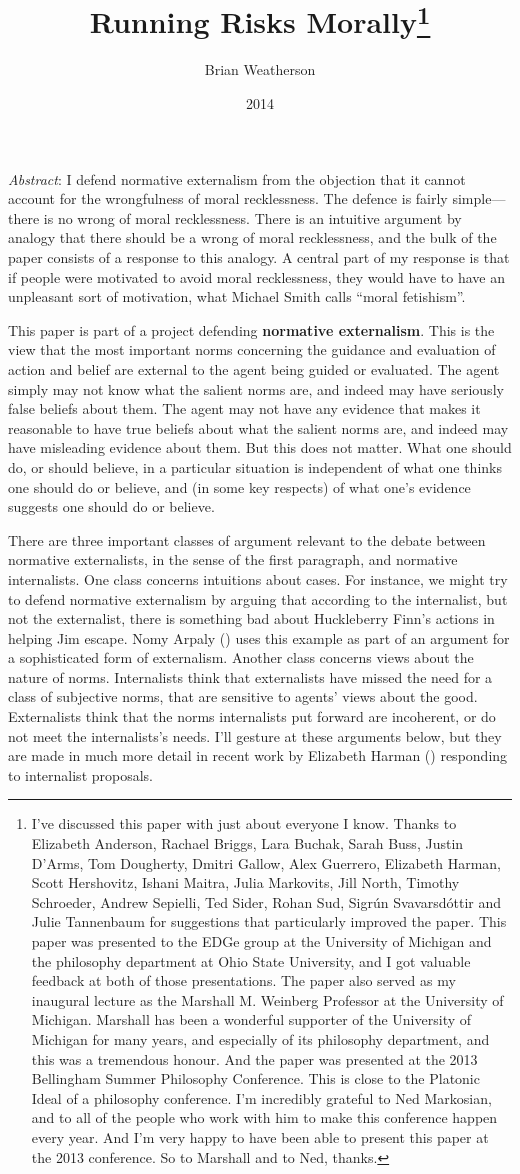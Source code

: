 \documentclass[
  11pt,
  letterpaper,
  DIV=11,
  numbers=noendperiod,
  twoside]{scrartcl}
\title{Running Risks Morally\thanks{I've discussed this paper with just
about everyone I know. Thanks to Elizabeth Anderson, Rachael Briggs,
Lara Buchak, Sarah Buss, Justin D'Arms, Tom Dougherty, Dmitri Gallow,
Alex Guerrero, Elizabeth Harman, Scott Hershovitz, Ishani Maitra, Julia
Markovits, Jill North, Timothy Schroeder, Andrew Sepielli, Ted Sider,
Rohan Sud, Sigrún Svavarsdóttir and Julie Tannenbaum for suggestions
that particularly improved the paper. This paper was presented to the
EDGe group at the University of Michigan and the philosophy department
at Ohio State University, and I got valuable feedback at both of those
presentations. The paper also served as my inaugural lecture as the
Marshall M. Weinberg Professor at the University of Michigan. Marshall
has been a wonderful supporter of the University of Michigan for many
years, and especially of its philosophy department, and this was a
tremendous honour. And the paper was presented at the 2013 Bellingham
Summer Philosophy Conference. This is close to the Platonic Ideal of a
philosophy conference. I'm incredibly grateful to Ned Markosian, and to
all of the people who work with him to make this conference happen every
year. And I'm very happy to have been able to present this paper at the
2013 conference. So to Marshall and to Ned, thanks.}}
\author{Brian Weatherson}
\date{2014}
\renewenvironment{abstract}
 {\vspace{-1.25cm}
 \quotation\small\noindent\emph{Abstract}:}
 {\endquotation}
\renewenvironment{abstract}
 {\quotation\small\noindent\emph{Abstract}:}
 {\endquotation\vspace{-0.02cm}}
\begin{document}
\maketitle
\begin{abstract}
I defend normative externalism from the objection that it cannot account
for the wrongfulness of moral recklessness. The defence is fairly
simple---there is no wrong of moral recklessness. There is an intuitive
argument by analogy that there should be a wrong of moral recklessness,
and the bulk of the paper consists of a response to this analogy. A
central part of my response is that if people were motivated to avoid
moral recklessness, they would have to have an unpleasant sort of
motivation, what Michael Smith calls ``moral fetishism''.
\end{abstract}


This paper is part of a project defending \textbf{normative
externalism}. This is the view that the most important norms concerning
the guidance and evaluation of action and belief are external to the
agent being guided or evaluated. The agent simply may not know what the
salient norms are, and indeed may have seriously false beliefs about
them. The agent may not have any evidence that makes it reasonable to
have true beliefs about what the salient norms are, and indeed may have
misleading evidence about them. But this does not matter. What one
should do, or should believe, in a particular situation is independent
of what one thinks one should do or believe, and (in some key respects)
of what one's evidence suggests one should do or believe.

There are three important classes of argument relevant to the debate
between normative externalists, in the sense of the first paragraph, and
normative internalists. One class concerns intuitions about cases. For
instance, we might try to defend normative externalism by arguing that
according to the internalist, but not the externalist, there is
something bad about Huckleberry Finn's actions in helping Jim escape.
Nomy Arpaly () uses this example as part
of an argument for a sophisticated form of externalism. Another class
concerns views about the nature of norms. Internalists think that
externalists have missed the need for a class of subjective norms, that
are sensitive to agents' views about the good. Externalists think that
the norms internalists put forward are incoherent, or do not meet the
internalists's needs. I'll gesture at these arguments below, but they
are made in much more detail in recent work by Elizabeth Harman
() responding to internalist proposals.
\end{document}
